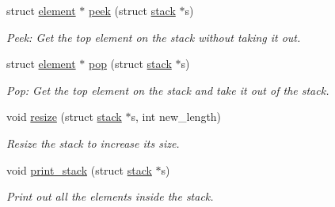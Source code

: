 \begin{DoxyCompactItemize}
struct \hyperlink{structstack_1_1element}{element} $\ast$ \hyperlink{structstack_a74694fb01344536f1f39e31cac67d6ad}{peek} (struct \hyperlink{structstack}{stack} $\ast$s)
\begin{DoxyCompactList}\small\item\em Peek\-: Get the top element on the stack without taking it out. \end{DoxyCompactList}\item 
struct \hyperlink{structstack_1_1element}{element} $\ast$ \hyperlink{structstack_a2a99ce490458ccef632cee629920aa6d}{pop} (struct \hyperlink{structstack}{stack} $\ast$s)
\begin{DoxyCompactList}\small\item\em Pop\-: Get the top element on the stack and take it out of the stack. \end{DoxyCompactList}\item 
void \hyperlink{structstack_a1959e1dd1a8515d62f235ec1537e656a}{resize} (struct \hyperlink{structstack}{stack} $\ast$s, int new\-\_\-length)
\begin{DoxyCompactList}\small\item\em Resize the stack to increase its size. \end{DoxyCompactList}\item 
void \hyperlink{structstack_a38ccd798635f5e46e8fb4ff83f1ae0e6}{print\-\_\-stack} (struct \hyperlink{structstack}{stack} $\ast$s)
\begin{DoxyCompactList}\small\item\em Print out all the elements inside the stack. \end{DoxyCompactList}\end{DoxyCompactItemize}
